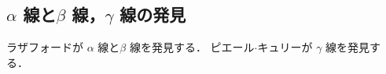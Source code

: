         \subsection{$\alpha$ 線と$\beta$ 線，$\gamma$ 線の発見}
        ラザフォードが $\alpha$ 線と$\beta$ 線を発見する．
        ピエール$\cdot$キュリーが $\gamma$ 線を発見する．
